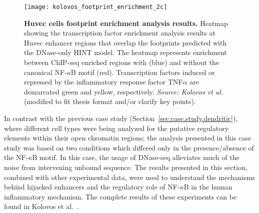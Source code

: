 \begin{figure}[h!]
\centering
\texttt{[image: kolovos\_footprint\_enrichment\_2c]}
\caption[Huvec cells footprint enrichment analysis results]{\textbf{Huvec cells footprint enrichment analysis results.} Heatmap showing the transcription factor enrichment analysis results at Huvec enhancer regions that overlap the footprints predicted with the DNase-only HINT model. The heatmap represents enrichment between ChIP-seq enriched regions with (blue) and without the canonical NF-$\kappa$B motif (red). Transcription factors induced or repressed by the inflammatory response factor TNF$\alpha$ are demarcated green and yellow, respectively. \emph{Source: Kolovos et al.}\cite{kolovos2016} (modified to fit thesis format and/or clarify key points).}
\label{fig:kolovos_footprint_enrichment_2c}
\end{figure}

In contrast with the previous case study (Section~\ref{sec:case.study.dendritic}), where different cell types were being analyzed for the putative regulatory elements within their open chromatin regions; the analysis presented in this case study was based on two conditions which differed only in the presence/absence of the NF-$\kappa$B motif. In this case, the usage of DNase-seq alleviates much of the noise from intervening unbound sequence. The results presented in this section, combined with other experimental data, were used to understand the mechanisms behind hijacked enhancers and the regulatory role of NF-$\kappa$B in the human inflammatory mechanism. The complete results of these experiments can be found in Kolovos et al.~\cite{kolovos2016}.

